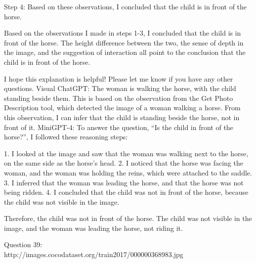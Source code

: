 \begin{enumerate}
        Step 4: Based on these observations, I concluded that the child is in front of the horse.
        
        Based on the observations I made in steps 1-3, I concluded that the child is in front of the horse. The height difference between the two, the sense of depth in the image, and the suggestion of interaction all point to the conclusion that the child is in front of the horse.
        
        I hope this explanation is helpful! Please let me know if you have any other questions.
        \subitem Visual ChatGPT: The woman is walking the horse, with the child standing beside them. This is based on the observation from the Get Photo Description tool, which detected the image of a woman walking a horse. From this observation, I can infer that the child is standing beside the horse, not in front of it.
        \subitem MiniGPT-4: To answer the question, “Is the child in front of the horse?”, I followed these reasoning steps:

        1. I looked at the image and saw that the woman was walking next to the horse, on the same side as the horse’s head.
        2. I noticed that the horse was facing the woman, and the woman was holding the reins, which were attached to the saddle.
        3. I inferred that the woman was leading the horse, and that the horse was not being ridden.
        4. I concluded that the child was not in front of the horse, because the child was not visible in the image.
        
        Therefore, the child was not in front of the horse. The child was not visible in the image, and the woman was leading the horse, not riding it.
    \end{enumerate}
    Question 39:\\http://images.cocodataset.org/train2017/000000368983.jpg

